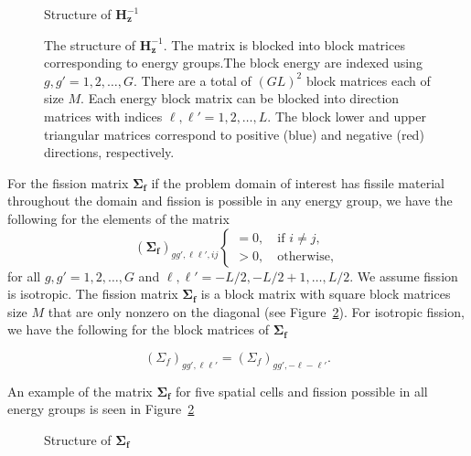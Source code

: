 \begin{figure}[!htbp]
	\centering
	\resizebox{0.75\textwidth}{!}{}
	\caption{Structure of $\mathbf{H}_{\mathbf{z}}^{-1}$}\label{fig:iHz}
	\caption*{The structure of $\mathbf{H}_{\mathbf{z}}^{-1}$. The matrix is blocked into block matrices corresponding to energy groups.The block energy are indexed using $g, g' = 1, 2, \dots, G$. There are a total of $(GL)^{2}$ block matrices each of size $M$. Each energy block matrix can be blocked into direction matrices with indices $\ell, \ell' = 1, 2, \dots, L$. The block lower and upper triangular matrices correspond to positive (blue) and negative (red) directions, respectively.}
\end{figure}

\clearpage

For the fission matrix $\mathbf{\Sigma_{f}}$ if the problem domain of interest has fissile material throughout the domain and fission is possible in any energy group, we have the following for the elements of the matrix
\begin{equation}
		(\mathbf{\Sigma_{f}})_{gg',\ell \ell', ij}
	\begin{cases}
 		= 0, \quad \text{if } i \neq j, \\
		> 0, \quad \text{otherwise},
	\end{cases}
\end{equation}
for all $g, g' = 1,2,\dots, G$ and $\ell, \ell' = -L/2, -L/2+1, \dots, L/2$. We assume fission is isotropic. The fission matrix $\mathbf{\Sigma_{f}}$ is a block matrix with square block matrices size $M$ that are only nonzero on the diagonal (see Figure~\ref{fig:F}). For isotropic fission, we have the following for the block matrices of $\mathbf{\Sigma_{f}}$

\begin{lemma}
\label{lemma:sigf}
\begin{equation}
	(\Sigma_{f})_{gg',\ell \ell'} = (\Sigma_{f})_{gg',-\ell -\ell'}. 
\end{equation}
\end{lemma}

An example of the matrix $\mathbf{\Sigma_{f}}$ for five spatial cells and fission possible in all energy groups is seen in Figure~\ref{fig:F}

\begin{figure}[!htbp]
	\begin{center}\resizebox{0.75\textwidth}{!}{} \end{center}
	\caption{Structure of $\mathbf{\Sigma_{f}}$}\label{fig:F}
\end{figure}

